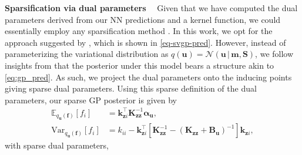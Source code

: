 \documentclass{article}
\renewcommand{\paragraph}[1]{{\bf #1}~~}
\newcommand{\mathbold}[1]{\bm{#1}}
\newcommand{\mbf}[1]{\mathbf{#1}}
\renewcommand{\mid}{\,|\,}
\newcommand{\MS}{\mbf{S}}
\newcommand{\T}{\top}
\newcommand{\valpha}[0]{\mathbold{\alpha}}
\newcommand{\MBeta}[0]{\mathbold{B}}
\newcommand{\vm}{\mbf{m}}
\newcommand{\vf}{\mbf{f}}
\newcommand{\vu}{\mbf{u}}
\newcommand{\MKzz}{\mbf{K}_{\mbf{z}\mbf{z}}}
\newcommand{\vkzs}{\mbf{k}_{\mbf{z}i}}
\newcommand{\myexpect}{\mathbb{E}}
\begin{document}
\paragraph{Sparsification via dual parameters}
\label{sec:sparse-dual-gp}
%
Given that we have computed the dual parameters derived from our NN predictions and a kernel function, we could essentially employ any sparsification method \citep{quinonero2005unifying}.
In this work, we opt for the approach suggested by \citet{titsias2009variational,hensman2013gaussian},
which is shown in \cref{eq-svgp-pred}.
However, instead of parameterizing the variational distribution as $q(\vu) = \mathcal{N}\left(\vu \mid \vm, \MS \right)$,
we follow insights from \citet{adam2021dual} that the posterior under this model bears a structure akin to \cref{eq:gp_pred}.
As such, we project the dual parameters onto the inducing points giving sparse dual parameters.
Using this sparse definition of the dual parameters, our sparse GP posterior is given by
%
\begin{subequations} \label{eq:dual_sparse_post}
\begin{align}
   \myexpect_{q_{\vu}(\vf)}[f_i] &= \vkzs^{\T} \MKzz^{-1} \valpha_{\vu}, \\
   \textrm{Var}_{q_{\vu}(\vf)}[f_i]  &= k_{ii} - \vkzs^\top [\MKzz^{-1} - (\MKzz + \MBeta_{\vu})^{-1} ]\vkzs, \nonumber
\end{align}
\end{subequations}
with sparse dual parameters,
\end{document}
